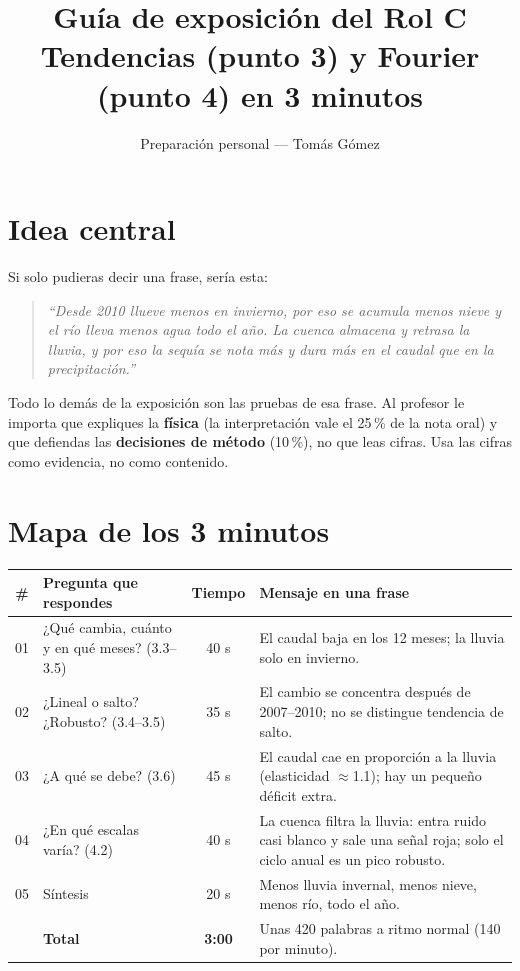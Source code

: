 \documentclass[11pt,letterpaper]{article}
\title{Guía de exposición del Rol C\\\large Tendencias (punto 3) y Fourier (punto 4) en 3 minutos}
\author{Preparación personal --- Tomás Gómez}
\date{}
\begin{document}
\sloppy
\maketitle

\section*{Idea central}

Si solo pudieras decir una frase, sería esta:
\begin{quote}
\emph{``Desde 2010 llueve menos en invierno, por eso se acumula menos nieve y el río lleva menos agua todo el
año. La cuenca almacena y retrasa la lluvia, y por eso la sequía se nota más y dura más en el caudal que en la
precipitación.''}
\end{quote}
Todo lo demás de la exposición son las pruebas de esa frase. Al profesor le importa que expliques la
\textbf{física} (la interpretación vale el 25\,\% de la nota oral) y que defiendas las \textbf{decisiones de
método} (10\,\%), no que leas cifras. Usa las cifras como evidencia, no como contenido.

\section*{Mapa de los 3 minutos}

\begin{table}[H]
\centering\small
\begin{tabularx}{\textwidth}{c l c X}
\toprule
\# & Pregunta que respondes & Tiempo & Mensaje en una frase \\
\midrule
01 & ¿Qué cambia, cuánto y en qué meses? (3.3--3.5) & 40 s & El caudal baja en los 12 meses; la lluvia solo en invierno. \\
02 & ¿Lineal o salto? ¿Robusto? (3.4--3.5) & 35 s & El cambio se concentra después de 2007--2010; no se distingue tendencia de salto. \\
03 & ¿A qué se debe? (3.6) & 45 s & El caudal cae en proporción a la lluvia (elasticidad $\approx$1.1); hay un pequeño déficit extra. \\
04 & ¿En qué escalas varía? (4.2) & 40 s & La cuenca filtra la lluvia: entra ruido casi blanco y sale una señal roja; solo el ciclo anual es un pico robusto. \\
05 & Síntesis & 20 s & Menos lluvia invernal, menos nieve, menos río, todo el año. \\
\midrule
 & \textbf{Total} & \textbf{3:00} & Unas 420 palabras a ritmo normal (140 por minuto). \\
\bottomrule
\end{tabularx}
\end{table}
\end{document}
